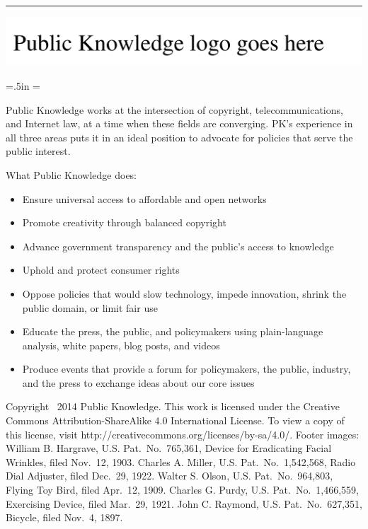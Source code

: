 \documentclass[11pt,twocolumn,titlepage]{article}
\begin{document}
\fi

\clearpage
\onecolumn

\hrule height 0pt depth 0pt

\vfill

\centerline{\includegraphics[width=.5\textwidth]{pkname-large.pdf}}

\baselineskip

\begingroup
\leftskip=.5in \rightskip=\leftskip

Public Knowledge works at the intersection of copyright, telecommunications, and
Internet law, at a time when these fields are converging. PK's experience in all
three areas puts it in an ideal position to advocate for policies that serve the
public interest.

What Public Knowledge does:

\begin{itemize}
\leftskip=.5in \rightskip=\leftskip
\item    Ensure universal access to affordable and open networks
\item    Promote creativity through balanced copyright
\item    Advance government transparency and the public’s access to knowledge
\item    Uphold and protect consumer rights
\item    Oppose policies that would slow technology, impede innovation, shrink
the public domain, or limit fair use
\item    Educate the press, the public, and policymakers using plain-language
analysis, white papers, blog posts, and videos
\item    Produce events that provide a forum for policymakers, the public,
industry, and the press to exchange ideas about our core issues
\end{itemize}

\endgroup

\vfill

\noindent Copyright \textcopyright\ 2014 Public Knowledge. This work is licensed
under the Creative Commons Attribution-ShareAlike 4.0 International License. To
view a copy of this license, visit
http://creativecommons.org/licenses/by-sa/4.0/.
Footer images:
William B. Hargrave, U.S. Pat.\ No.\ 765,361, Device for Eradicating Facial
Wrinkles, filed Nov.\ 12, 1903.
Charles A. Miller, U.S. Pat.\ No.\ 1,542,568, Radio Dial Adjuster, filed Dec.\
29, 1922.
Walter S. Olson, U.S. Pat.\ No.\ 964,803, Flying Toy Bird, filed Apr.\ 12, 1909.
Charles G. Purdy, U.S. Pat.\ No.\ 1,466,559, Exercising Device, filed Mar.\ 29,
1921.
John C. Raymond, U.S. Pat.\ No.\ 627,351, Bicycle, filed Nov.\ 4, 1897.
\end{document}
